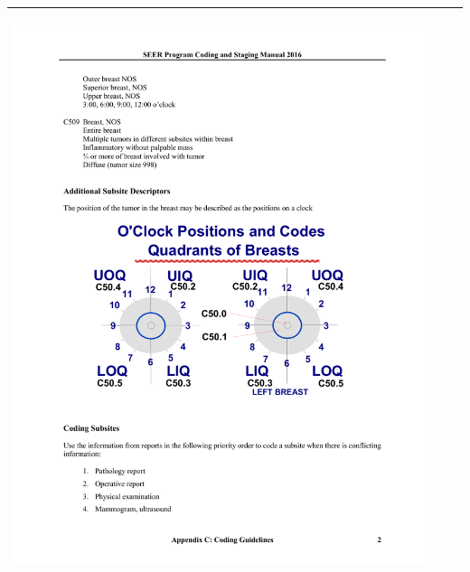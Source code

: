 \begin{table}[!htb]
\begin{threeparttable}
\begin{tabular}{p{2.5cm} p{7.5cm} p{6.5cm}}
			\begin{center}\includegraphics[width=0.75\linewidth]{IMAGENES/icd_Breast_Clock_Position}\end{center}
			\\ \hline
			
			
		\end{tabular}
	\end{threeparttable}
\end{table}

